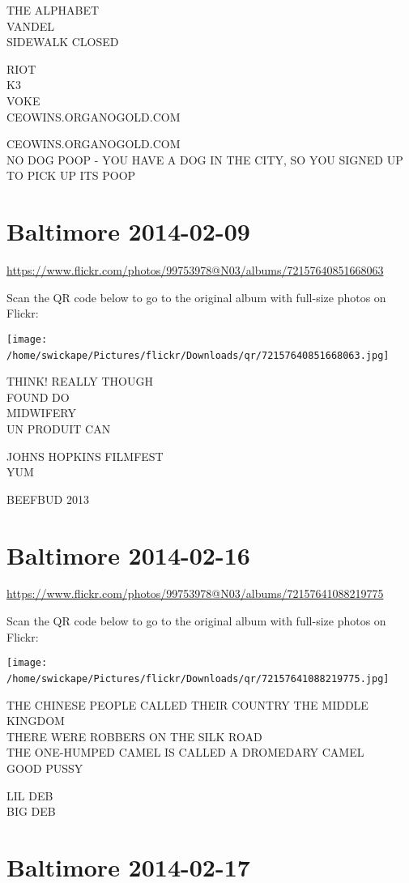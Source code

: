 \documentclass[10pt,letterpaper]{article}
\begin{document}
THE ALPHABET\\
VANDEL\\
SIDEWALK CLOSED

RIOT\\
K3\\
VOKE\\
CEOWINS.ORGANOGOLD.COM

CEOWINS.ORGANOGOLD.COM\\
NO DOG POOP {-} YOU HAVE A DOG IN THE CITY, SO YOU SIGNED UP TO PICK UP ITS POOP
\

\section*{Baltimore 2014-02-09}

\url{https://www.flickr.com/photos/99753978@N03/albums/72157640851668063}

Scan the QR code below to go to the original album with full-size photos on Flickr:

\texttt{[image: /home/swickape/Pictures/flickr/Downloads/qr/72157640851668063.jpg]}
\

THINK!  REALLY THOUGH\\
FOUND DO\\
MIDWIFERY\\
UN PRODUIT CAN

JOHNS HOPKINS FILMFEST\\
YUM

BEEFBUD 2013
\

\section*{Baltimore 2014-02-16}

\url{https://www.flickr.com/photos/99753978@N03/albums/72157641088219775}

Scan the QR code below to go to the original album with full-size photos on Flickr:

\texttt{[image: /home/swickape/Pictures/flickr/Downloads/qr/72157641088219775.jpg]}
\

THE CHINESE PEOPLE CALLED THEIR COUNTRY THE MIDDLE KINGDOM\\
THERE WERE ROBBERS ON THE SILK ROAD\\
THE ONE{-}HUMPED CAMEL IS CALLED A DROMEDARY CAMEL\\
GOOD PUSSY

LIL DEB\\
BIG DEB
\

\section*{Baltimore 2014-02-17}
\end{document}
